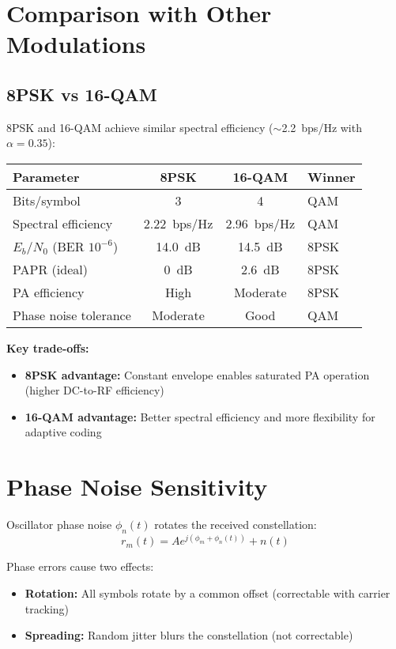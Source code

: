 \section{Comparison with Other Modulations}

\subsection{8PSK vs 16-QAM}

8PSK and 16-QAM achieve similar spectral efficiency ($\sim$2.2~bps/Hz with $\alpha = 0.35$):

\begin{center}
\begin{tabular}{@{}lccl@{}}
\toprule
Parameter & 8PSK & 16-QAM & Winner \\
\midrule
Bits/symbol & 3 & 4 & QAM \\
Spectral efficiency & 2.22~bps/Hz & 2.96~bps/Hz & QAM \\
$E_b/N_0$ (BER $10^{-6}$) & 14.0~dB & 14.5~dB & 8PSK \\
PAPR (ideal) & 0~dB & 2.6~dB & 8PSK \\
PA efficiency & High & Moderate & 8PSK \\
Phase noise tolerance & Moderate & Good & QAM \\
\bottomrule
\end{tabular}
\end{center}

\textbf{Key trade-offs:}
\begin{itemize}
\item \textbf{8PSK advantage:} Constant envelope enables saturated PA operation (higher DC-to-RF efficiency)
\item \textbf{16-QAM advantage:} Better spectral efficiency and more flexibility for adaptive coding
\end{itemize}

\section{Phase Noise Sensitivity}

Oscillator phase noise $\phi_n(t)$ rotates the received constellation:
\begin{equation}
r_m(t) = Ae^{j(\phi_m + \phi_n(t))} + n(t)
\end{equation}

Phase errors cause two effects:
\begin{itemize}
\item \textbf{Rotation:} All symbols rotate by a common offset (correctable with carrier tracking)
\item \textbf{Spreading:} Random jitter blurs the constellation (not correctable)
\end{itemize}

